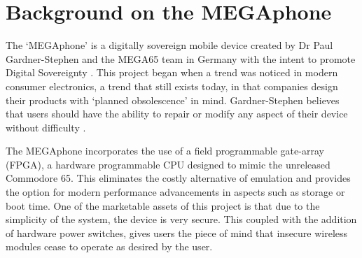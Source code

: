 

\section{Background on the MEGAphone} %

The ‘MEGAphone’ is a digitally sovereign mobile device created by Dr Paul Gardner-Stephen and the MEGA65 team in Germany with the intent to promote Digital Sovereignty \cite{mega65}.
This project began when a trend was noticed in modern consumer electronics, a trend that still exists today, in that companies design their products with ‘planned obsolescence’ in mind. 
Gardner-Stephen believes that users should have the ability to repair or modify any aspect of their device without difficulty \cite{mobilehistory}.

The MEGAphone incorporates the use of a field programmable gate-array (FPGA), a hardware programmable CPU designed to mimic the unreleased Commodore 65.
This eliminates the costly alternative of emulation and provides the option for modern performance advancements in aspects such as storage or boot time.
One of the marketable assets of this project is that due to the simplicity of the system, the device is very secure.
This coupled with the addition of hardware power switches, gives users the piece of mind that insecure wireless modules cease to operate as desired by the user.

